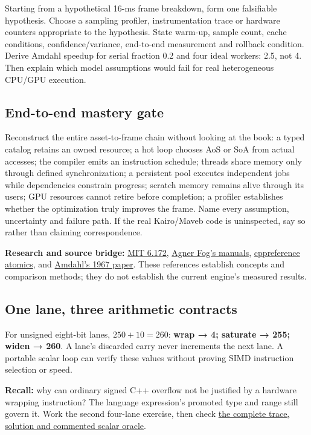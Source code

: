 Starting from a hypothetical 16-ms frame breakdown, form one falsifiable hypothesis. Choose a sampling profiler, instrumentation trace or hardware counters appropriate to the hypothesis. State warm-up, sample count, cache conditions, confidence/variance, end-to-end measurement and rollback condition. Derive Amdahl speedup for serial fraction 0.2 and four ideal workers: 2.5, not 4. Then explain which model assumptions would fail for real heterogeneous CPU/GPU execution.

\subsection{End-to-end mastery gate}\label{appendix-2587680a4fe3-end-to-end-mastery-gate}

Reconstruct the entire asset-to-frame chain without looking at the book: a typed catalog retains an owned resource; a hot loop chooses AoS or SoA from actual accesses; the compiler emits an instruction schedule; threads share memory only through defined synchronization; a persistent pool executes independent jobs while dependencies constrain progress; scratch memory remains alive through its users; GPU resources cannot retire before completion; a profiler establishes whether the optimization truly improves the frame. Name every assumption, uncertainty and failure path. If the real Kairo/Maveb code is uninspected, say so rather than claiming correspondence.

\textbf{Research and source bridge:} \href{https://ocw.mit.edu/courses/6-172-performance-engineering-of-software-systems-fall-2018/video_galleries/lecture-videos/}{MIT 6.172}, \href{https://www.agner.org/optimize/}{Agner Fog's manuals}, \href{https://en.cppreference.com/w/cpp/atomic/memory_order}{cppreference atomics}, and \href{https://doi.org/10.1145/1465482.1465560}{Amdahl's 1967 paper}. These references establish concepts and comparison methods; they do not establish the current engine's measured results.

\subsection{One lane, three arithmetic contracts}\label{appendix-2587680a4fe3-one-lane-three-arithmetic-contracts}

For unsigned eight-bit lanes, \(250+10=260\): \textbf{wrap → 4; saturate → 255; widen → 260}. A lane's discarded carry never increments the next lane. A portable scalar loop can verify these values without proving SIMD instruction selection or speed.

\textbf{Recall:} why can ordinary signed C++ overflow not be justified by a hardware wrapping instruction? The language expression's promoted type and range still govern it. Work the second four-lane exercise, then check \hyperref[01-foundations-i-ch007-three-lane-arithmetic-contracts-wrap-saturate-and-widen]{the complete trace, solution and commented scalar oracle}.
